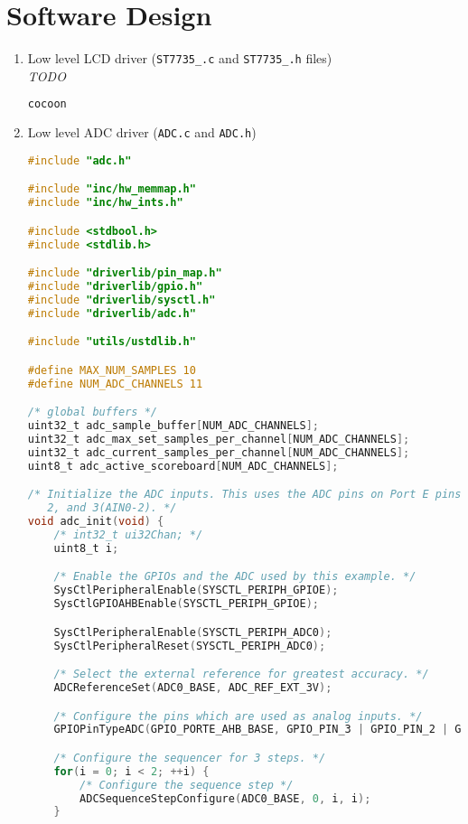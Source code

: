 \documentclass[12pt]{article}
\newcommand{\todo}{{\LARGE \emph{\color{red}TODO}}}
\begin{document}
\section{Software Design}
\begin{enumerate}[1)]
\item Low level LCD driver (\verb|ST7735_.c| and \verb|ST7735_.h|
  files) \\

  \todo
  \begin{lstlisting}[language=C]
    cocoon
  \end{lstlisting}
\item Low level ADC driver (\verb|ADC.c| and \verb|ADC.h|) \\
  \begin{lstlisting}[language=C]
    #include "adc.h"

#include "inc/hw_memmap.h"
#include "inc/hw_ints.h"

#include <stdbool.h>
#include <stdlib.h>

#include "driverlib/pin_map.h"
#include "driverlib/gpio.h"
#include "driverlib/sysctl.h"
#include "driverlib/adc.h"

#include "utils/ustdlib.h"

#define MAX_NUM_SAMPLES 10
#define NUM_ADC_CHANNELS 11

/* global buffers */
uint32_t adc_sample_buffer[NUM_ADC_CHANNELS];
uint32_t adc_max_set_samples_per_channel[NUM_ADC_CHANNELS];
uint32_t adc_current_samples_per_channel[NUM_ADC_CHANNELS];
uint8_t adc_active_scoreboard[NUM_ADC_CHANNELS];

/* Initialize the ADC inputs. This uses the ADC pins on Port E pins 1,
   2, and 3(AIN0-2). */
void adc_init(void) {
    /* int32_t ui32Chan; */
    uint8_t i;

    /* Enable the GPIOs and the ADC used by this example. */
    SysCtlPeripheralEnable(SYSCTL_PERIPH_GPIOE);
    SysCtlGPIOAHBEnable(SYSCTL_PERIPH_GPIOE);

    SysCtlPeripheralEnable(SYSCTL_PERIPH_ADC0);
    SysCtlPeripheralReset(SYSCTL_PERIPH_ADC0);

    /* Select the external reference for greatest accuracy. */
    ADCReferenceSet(ADC0_BASE, ADC_REF_EXT_3V);

    /* Configure the pins which are used as analog inputs. */
    GPIOPinTypeADC(GPIO_PORTE_AHB_BASE, GPIO_PIN_3 | GPIO_PIN_2 | GPIO_PIN_1);

    /* Configure the sequencer for 3 steps. */
    for(i = 0; i < 2; ++i) {
        /* Configure the sequence step */
        ADCSequenceStepConfigure(ADC0_BASE, 0, i, i);
    }


\end{lstlisting}
\end{enumerate}
\end{document}
